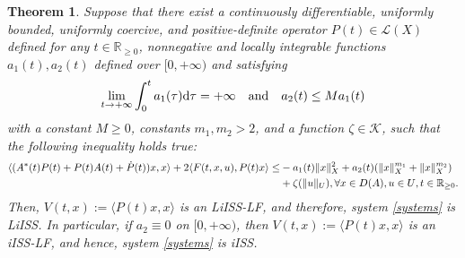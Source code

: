 \documentclass[onecolumn]{autart}
\newtheorem{theorem}{Theorem} %
\newenvironment{proof of Prop.ODE}{{\it Proof of Proposition~\ref{Prop.ODE}:\enspace}}{\hfill $\blacksquare$\par}
\newenvironment{proof of PDE}{{\it Proof of Proposition \ref{Prop.8}:\enspace}}{\hfill $\blacksquare$\par}
\newtheorem{assumption}{Assumption}
\begin{document}
{%

%
%
%
%


\begin{theorem}\label{Thm2}
Suppose that there exist  a continuously differentiable,  {uniformly bounded,    uniformly  coercive}, and  positive-definite operator $P(t)\in {\mathscr{L}}( X )$  defined for any $t\in\mathbb{R}_{\geq0}$,  nonnegative and locally integrable functions $a_1(t), a_2(t)$ defined over $[0,+\infty)$ and satisfying
\begin{align*}
	\lim\limits_{t\rightarrow +\infty}\int_0^ta_1(\tau){\rm{d}}\tau=+\infty\quad   \text{and}\quad
	a_2(t)\leq M a_1(t)
\end{align*}
with a constant $M\geq 0$,   constants  $m_1,m_2>2$,  and a function $\zeta \in\mathcal{K}$, such that the following inequality holds true:
\begin{align}\label{ro}
	\langle ( {A^*(t)P(t)+P(t)A(t)+\dot{P}(t)})x , x\rangle+2\langle F(t, x, u), P(t)x \rangle
	\leq&-a_1(t)\|x\|^2_{ X }+ a_2(t) {\left(\|x\|^{m_1}_ X +\|x\|^{m_2}_ X \right)}\notag\\
	&+ {\zeta({\|u\|_{U}})}, \forall x\in D(A),{u\in U}, t\in\mathbb{R}_{\geq 0}.
\end{align}
Then, $ V(t,x):=\langle {P(t)}x, x \rangle $ is {an} {LiISS-LF}, and therefore, system \eqref{systems} is LiISS. In particular, if $a_2\equiv 0$ on $[0,+\infty)$, then $ V(t,x):=\langle {P(t)}x, x \rangle $ is {an} {iISS-LF}, and hence, system \eqref{systems} is iISS.
\end{theorem}

}
\end{document}
